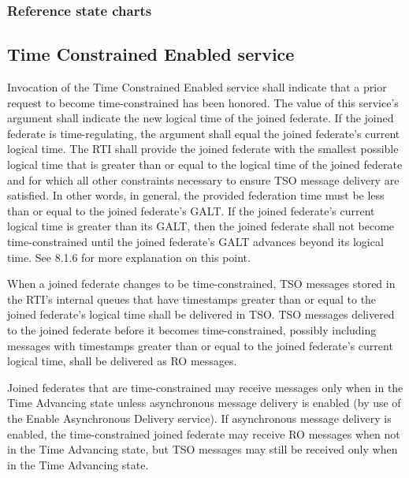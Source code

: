 \begin{compactstdpage}


    \subsubsection{Reference state charts}


    \subsection{Time Constrained Enabled \rtiinitiated{} service}

    Invocation of the Time Constrained Enabled \rtiinitiated{} service shall indicate that a prior request to become time-constrained has been honored. The value of this service's argument shall indicate the new logical time of the joined federate. If the joined federate is time-regulating, the argument shall equal the joined federate's current logical time. The RTI shall provide the joined federate with the smallest possible logical time that is greater than or equal to the logical time of the joined federate and for which all other constraints necessary to ensure TSO message delivery are satisfied. In other words, in general, the provided federation time must be less than or equal to the joined federate's GALT. If the joined federate's current logical time is greater than its GALT, then the joined federate shall not become time-constrained until the joined federate's GALT advances beyond its logical time. See 8.1.6 for more explanation on this point.

    When a joined federate changes to be time-constrained, TSO messages stored in the RTI's internal queues that have timestamps greater than or equal to the joined federate's logical time shall be delivered in TSO. TSO messages delivered to the joined federate before it becomes time-constrained, possibly including messages with timestamps greater than or equal to the joined federate's current logical time, shall be delivered as RO messages.

    Joined federates that are time-constrained may receive messages only when in the Time Advancing state unless asynchronous message delivery is enabled (by use of the Enable Asynchronous Delivery \rtiinitiated{} service). If asynchronous message delivery is enabled, the time-constrained joined federate may receive RO messages when not in the Time Advancing state, but TSO messages may still be received only when in the Time Advancing state.


\end{compactstdpage}

